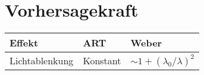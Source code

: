 \section{Vorhersagekraft}
\begin{table}[H]
    \centering
    \begin{tabular}{lp{3cm}l}
        \toprule
        Effekt & ART & Weber \\
        \midrule
        Lichtablenkung & Konstant & $\sim 1 + (\lambda_0/\lambda)^2$ \\
        \bottomrule
    \end{tabular}
\end{table}